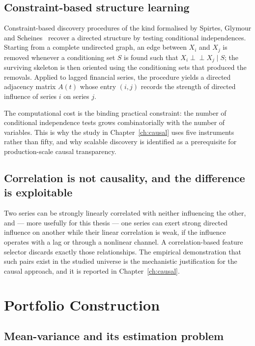 \subsection{Constraint-based structure learning}

Constraint-based discovery procedures of the kind formalised by Spirtes, Glymour and
Scheines~\cite{spirtes2000} recover a directed structure by testing conditional independences.
Starting from a complete undirected graph, an edge between $X_i$ and $X_j$ is removed whenever a
conditioning set $S$ is found such that $X_i \perp\!\!\!\perp X_j \mid S$; the surviving skeleton
is then oriented using the conditioning sets that produced the removals. Applied to lagged
financial series, the procedure yields a directed adjacency matrix $A(t)$ whose entry $(i,j)$
records the strength of directed influence of series $i$ on series $j$.

The computational cost is the binding practical constraint: the number of conditional
independence tests grows combinatorially with the number of variables. This is why the study in
Chapter~\ref{ch:causal} uses five instruments rather than fifty, and why scalable discovery is
identified as a prerequisite for production-scale causal transparency.

\subsection{Correlation is not causality, and the difference is exploitable}

Two series can be strongly linearly correlated with neither influencing the other, and --- more
usefully for this thesis --- one series can exert strong directed influence on another while
their linear correlation is weak, if the influence operates with a lag or through a nonlinear
channel. A correlation-based feature selector discards exactly those relationships. The
empirical demonstration that such pairs exist in the studied universe is the mechanistic
justification for the causal approach, and it is reported in Chapter~\ref{ch:causal}.

\section{Portfolio Construction}

\subsection{Mean-variance and its estimation problem}

